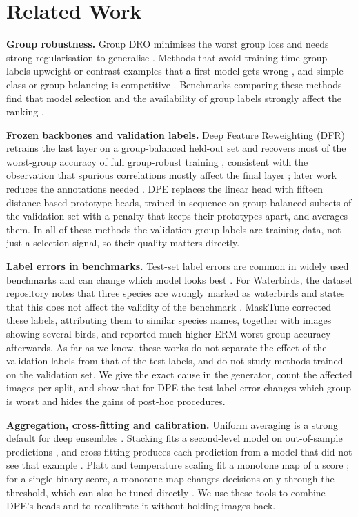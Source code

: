 \section{Related Work}
\textbf{Group robustness.} Group DRO minimises the worst group loss and needs strong regularisation to generalise \cite{sagawa2020groupdro}. Methods that avoid training-time group labels upweight or contrast examples that a first model gets wrong \cite{liu2021jtt,nam2020lff,zhang2022cnc}, and simple class or group balancing is competitive \cite{idrissi2022balancing}. Benchmarks comparing these methods find that model selection and the availability of group labels strongly affect the ranking \cite{yang2023subpopbench}.

\textbf{Frozen backbones and validation labels.} Deep Feature Reweighting (DFR) retrains the last layer on a group-balanced held-out set and recovers most of the worst-group accuracy of full group-robust training \cite{kirichenko2023dfr}, consistent with the observation that spurious correlations mostly affect the final layer \cite{izmailov2022feature}; later work reduces the annotations needed \cite{labonte2023fewer,qiu2023afr}. DPE \cite{to2025dpe} replaces the linear head with fifteen distance-based prototype heads, trained in sequence on group-balanced subsets of the validation set with a penalty that keeps their prototypes apart, and averages them. In all of these methods the validation group labels are training data, not just a selection signal, so their quality matters directly.

\textbf{Label errors in benchmarks.} Test-set label errors are common in widely used benchmarks and can change which model looks best \cite{northcutt2021pervasive}. For Waterbirds, the dataset repository notes that three species are wrongly marked as waterbirds and states that this does not affect the validity of the benchmark \cite{sagawa2020code}. MaskTune \cite{asgari2022masktune} corrected these labels, attributing them to similar species names, together with images showing several birds, and reported much higher ERM worst-group accuracy afterwards. As far as we know, these works do not separate the effect of the validation labels from that of the test labels, and do not study methods trained on the validation set. We give the exact cause in the generator, count the affected images per split, and show that for DPE the test-label error changes which group is worst and hides the gains of post-hoc procedures.

\textbf{Aggregation, cross-fitting and calibration.} Uniform averaging is a strong default for deep ensembles \cite{lakshminarayanan2017deepensembles}. Stacking fits a second-level model on out-of-sample predictions \cite{wolpert1992stacking,breiman1996stacked}, and cross-fitting produces each prediction from a model that did not see that example \cite{chernozhukov2018dml}. Platt and temperature scaling fit a monotone map of a score \cite{platt1999probabilistic,guo2017calibration}; for a single binary score, a monotone map changes decisions only through the threshold, which can also be tuned directly \cite{elkan2001cost,menon2021logit}. We use these tools to combine DPE's heads and to recalibrate it without holding images back.
